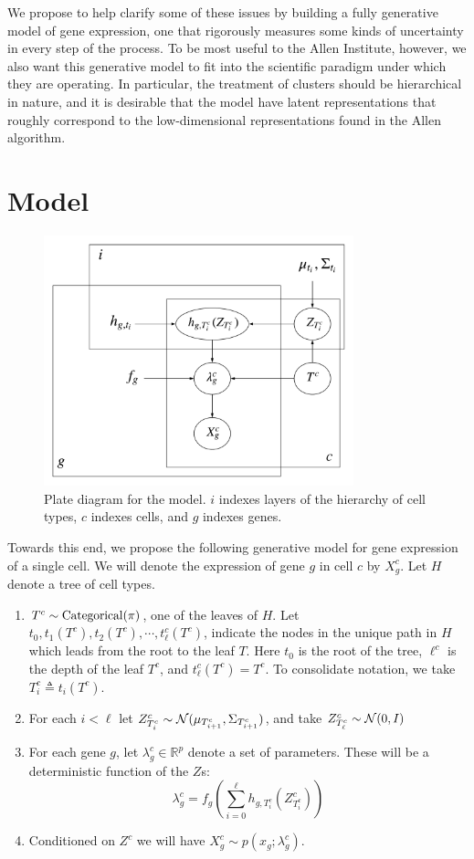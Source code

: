 We propose to help clarify some of these issues by building a fully generative model of gene expression, one that rigorously measures some kinds of uncertainty in every step of the process.  To be most useful to the Allen Institute, however, we also want this generative model to fit into the scientific paradigm under which they are operating.  In particular, the treatment of clusters should be hierarchical in nature, and it is desirable that the model have latent representations that roughly correspond to the low-dimensional representations found in the Allen algorithm.  

\section{Model}

\begin{figure}
\includegraphics[width=0.8\textwidth]{pics/plate}
\caption{Plate diagram for the model\label{fig:plate}.  $i$ indexes layers of the hierarchy of cell types, $c$ indexes cells, and $g$ indexes genes.}
\end{figure}

Towards this end, we propose the following generative model for gene expression of a single cell.  We will denote the expression of gene $g$ in cell $c$ by $X_g^c$.  Let $H$ denote a tree of cell types.   

\begin{enumerate}
\item $T^c \sim \operatorname*{Categorical}(\pi)$, one of the leaves of $H$.  Let $t_0,t_1(T^c),t_2(T^c),\cdots ,t_\ell^c(T^c)$, indicate the nodes in the unique path in $H$ which leads from the root to the leaf $T$.  Here $t_0$ is the root of the tree, $\ell^c$ is the depth of the leaf $T^c$, and $t^c_\ell(T^c)=T^c$.   To consolidate notation, we take $T^c_i \triangleq t_i(T^c)$.
\item For each $i<\ell$ let $Z^c_{T^c_i} \sim \mathcal{N}(\mu_{T^c_{i+1}},\Sigma_{T^c_{i+1}})$, and take $Z^c_{T^c_\ell} \sim \mathcal{N}(0,I)$
\item For each gene $g$, let $\lambda^c_g \in \mathbb R^{p}$ denote a set of parameters.  These will be a deterministic function of the $Z$s:
\[
\lambda^c_g = f_g \left(\sum_{i=0}^{\ell} h_{g,T^c_i}(Z^c_{T^c_i})\right)
\]
\item Conditioned on $Z^c$ we will have $X^c_g \sim p(x_g ; \lambda^c_g)$. 
\end{enumerate}

